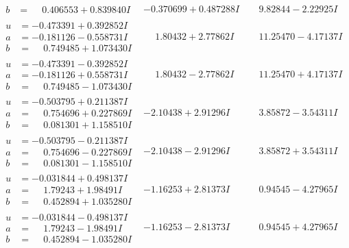 \documentclass[1p]{elsarticle_modified}
\theoremstyle{definition}
\begin{document}
$$\begin{array}{c|c|c}
\begin{aligned}
b &= \phantom{-}0.406553 + 0.839840 I\end{aligned}
 & -0.370699 + 0.487288 I & \phantom{-}9.82844 - 2.22925 I \\ \hline\begin{aligned}
u &= -0.473391 + 0.392852 I \\
a &= -0.181126 - 0.558731 I \\
b &= \phantom{-}0.749485 + 1.073430 I\end{aligned}
 & \phantom{-}1.80432 + 2.77862 I & \phantom{-}11.25470 - 4.17137 I \\ \hline\begin{aligned}
u &= -0.473391 - 0.392852 I \\
a &= -0.181126 + 0.558731 I \\
b &= \phantom{-}0.749485 - 1.073430 I\end{aligned}
 & \phantom{-}1.80432 - 2.77862 I & \phantom{-}11.25470 + 4.17137 I \\ \hline\begin{aligned}
u &= -0.503795 + 0.211387 I \\
a &= \phantom{-}0.754696 + 0.227869 I \\
b &= \phantom{-}0.081301 + 1.158510 I\end{aligned}
 & -2.10438 + 2.91296 I & \phantom{-}3.85872 - 3.54311 I \\ \hline\begin{aligned}
u &= -0.503795 - 0.211387 I \\
a &= \phantom{-}0.754696 - 0.227869 I \\
b &= \phantom{-}0.081301 - 1.158510 I\end{aligned}
 & -2.10438 - 2.91296 I & \phantom{-}3.85872 + 3.54311 I \\ \hline\begin{aligned}
u &= -0.031844 + 0.498137 I \\
a &= \phantom{-}1.79243 + 1.98491 I \\
b &= \phantom{-}0.452894 + 1.035280 I\end{aligned}
 & -1.16253 + 2.81373 I & \phantom{-}0.94545 - 4.27965 I \\ \hline\begin{aligned}
u &= -0.031844 - 0.498137 I \\
a &= \phantom{-}1.79243 - 1.98491 I \\
b &= \phantom{-}0.452894 - 1.035280 I\end{aligned}
 & -1.16253 - 2.81373 I & \phantom{-}0.94545 + 4.27965 I\\

\end{array}$$
\end{document}
